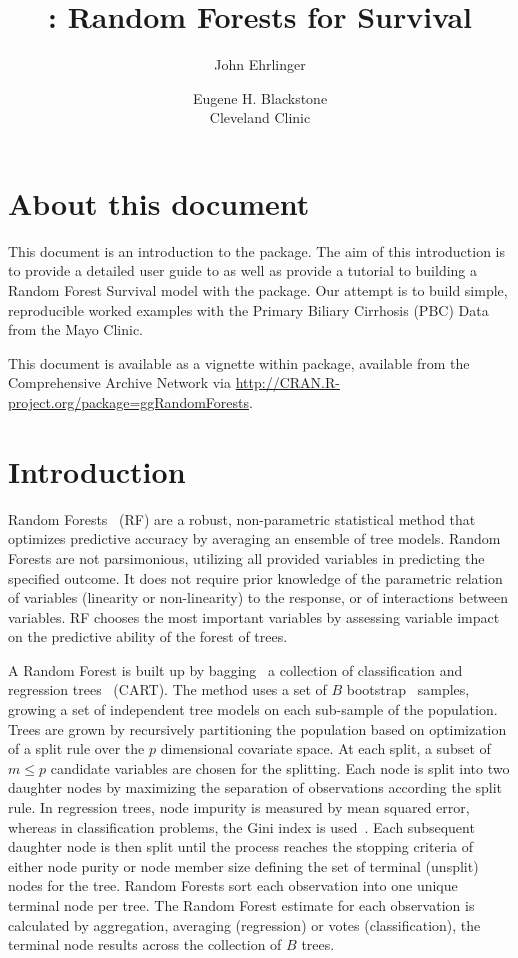 \documentclass[nojss]{jss}
\author{John Ehrlinger 
\and Eugene H. Blackstone\\Cleveland Clinic}
\title{\pkg{ggRandomForests}: Random Forests for Survival}
\begin{document}
\section{About this document}
This document is an introduction to the   package. The aim of this introduction is to provide a detailed user guide to  as well as provide a tutorial to building a Random Forest Survival model with the  package. Our attempt is to build simple, reproducible worked examples with the Primary Biliary Cirrhosis (PBC) Data from the Mayo Clinic.

This document is available as a vignette within  package, available from the Comprehensive  Archive Network via \url{http://CRAN.R-project.org/package=ggRandomForests}.

\section{Introduction} \label{S:introduction}

Random Forests~\citep{Breiman:2001} (RF) are a robust, non-parametric statistical method that optimizes predictive accuracy by averaging an ensemble of tree models. Random Forests are not parsimonious, utilizing all provided variables in predicting the specified outcome. It does not require prior knowledge of the parametric relation of variables (linearity or non-linearity) to the response, or of interactions between variables. RF chooses the most important variables by assessing variable impact on the predictive ability of the forest of trees.

A Random Forest is built up by bagging~\citep{Breiman:1996} a collection of classification and regression trees~\citep{cart:1984} (CART). The method uses a set of $B$ bootstrap~\citep{bootstrap:1994} samples, growing a set of independent tree models on each sub-sample of the population. Trees are grown by recursively partitioning the population based on optimization of a split rule over the $p$ dimensional covariate space. At each split, a subset of  $m \le p$ candidate variables are chosen for the splitting. Each node is split into two daughter nodes by maximizing the separation of observations according the split rule. In regression trees, node impurity is measured by mean squared error, whereas in classification problems, the Gini index is used~\citep{FriedmanGreedyfunction:2000}. Each subsequent daughter node is then split until the process reaches the stopping criteria of either node purity or node member size defining the set of terminal (unsplit) nodes for the tree. Random Forests sort each observation into one unique terminal node per tree. The Random Forest estimate for each observation is calculated by aggregation, averaging (regression) or votes (classification), the terminal node results across the collection of $B$ trees. 
\end{document}
